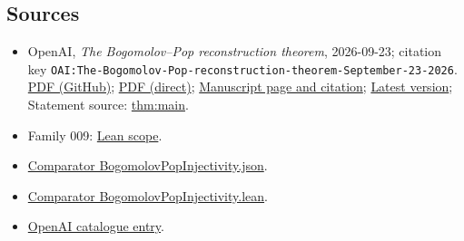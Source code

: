 \documentclass[11pt]{article}
\begin{document}
\subsection{Sources}
\begin{itemize}
\item OpenAI, \emph{The Bogomolov–Pop reconstruction theorem}, 2026-09-23; citation key \texttt{OAI:The-Bogomolov-Pop-reconstruction-theorem-September-23-2026}. \href{https://github.com/openai/math/blob/adc7f1241b42e322a6451854ab7e4b4c146bf78a/preprints/The-Bogomolov-Pop-reconstruction-theorem-September-23-2026/paper.pdf}{PDF (GitHub)}; \href{https://github.com/openai/math/raw/adc7f1241b42e322a6451854ab7e4b4c146bf78a/preprints/The-Bogomolov-Pop-reconstruction-theorem-September-23-2026/paper.pdf}{PDF (direct)}; \href{https://github.com/openai/math/blob/adc7f1241b42e322a6451854ab7e4b4c146bf78a/preprints/The-Bogomolov-Pop-reconstruction-theorem-September-23-2026/README.md}{Manuscript page and citation}; \href{https://github.com/openai/math/blob/main/preprints/The-Bogomolov-Pop-reconstruction-theorem-September-23-2026/paper.pdf}{Latest version}; Statement source: \href{https://github.com/openai/math/blob/adc7f1241b42e322a6451854ab7e4b4c146bf78a/preprints/The-Bogomolov-Pop-reconstruction-theorem-September-23-2026/build/introduction.tex\#L55}{thm:main}.
\item Family 009: \href{https://github.com/openai/math/blob/adc7f1241b42e322a6451854ab7e4b4c146bf78a/lean/docs/009.md}{Lean scope}.
\item \href{https://github.com/openai/math/blob/adc7f1241b42e322a6451854ab7e4b4c146bf78a/lean/ComparatorChallenges/BogomolovPopInjectivity.json}{Comparator BogomolovPopInjectivity.json}.
\item \href{https://github.com/openai/math/blob/adc7f1241b42e322a6451854ab7e4b4c146bf78a/lean/ComparatorChallenges/BogomolovPopInjectivity.lean}{Comparator BogomolovPopInjectivity.lean}.
\item \href{https://github.com/openai/math/blob/adc7f1241b42e322a6451854ab7e4b4c146bf78a/CONTENTS.md}{OpenAI catalogue entry}.
\end{itemize}
\end{document}
